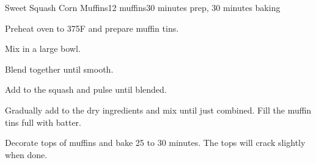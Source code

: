 \documentclass[../Cookbook.tex]{subfiles}
\begin{document}
\begin{recipe}{Sweet Squash Corn Muffins}{12 muffins}{30 minutes prep, 30 minutes baking}

Preheat oven to 375\0F and prepare muffin tins.

Mix in a large bowl.

Blend together until smooth.

Add to the squash and pulse until blended.

Gradually add to the dry ingredients and mix until just combined. Fill the muffin tins full with batter.

Decorate tops of muffins and bake 25 to 30 minutes. The tops will crack slightly when done.

\end{recipe}
\end{document}
